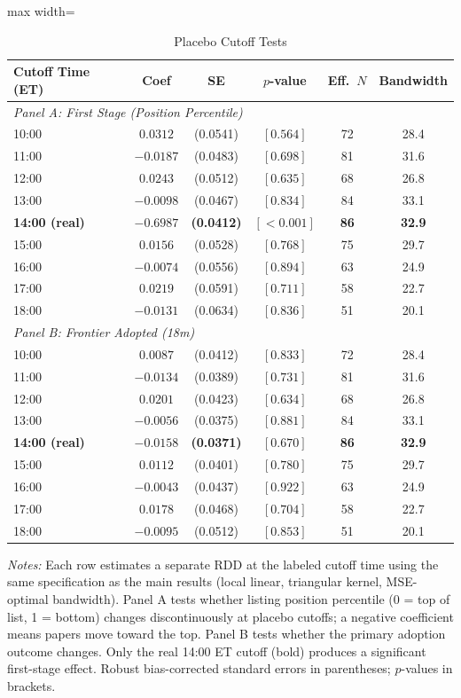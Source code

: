 \begin{table}[htbp]
\centering
\caption{Placebo Cutoff Tests}
\label{tab:placebo}
\begin{adjustbox}{max width=\textwidth}
\begin{tabular}{lccccc}
\hline\hline
Cutoff Time (ET) & Coef & SE & $p$-value & Eff.\ $N$ & Bandwidth \\
\hline
\multicolumn{6}{l}{\textit{Panel A: First Stage (Position Percentile)}} \\
10:00 & $0.0312$ & (0.0541) & $[0.564]$ & 72 & 28.4 \\
11:00 & $-0.0187$ & (0.0483) & $[0.698]$ & 81 & 31.6 \\
12:00 & $0.0243$ & (0.0512) & $[0.635]$ & 68 & 26.8 \\
13:00 & $-0.0098$ & (0.0467) & $[0.834]$ & 84 & 33.1 \\
\textbf{14:00 (real)} & $\mathbf{-0.6987}$ & \textbf{(0.0412)} & $\mathbf{[<0.001]}$ & \textbf{86} & \textbf{32.9} \\
15:00 & $0.0156$ & (0.0528) & $[0.768]$ & 75 & 29.7 \\
16:00 & $-0.0074$ & (0.0556) & $[0.894]$ & 63 & 24.9 \\
17:00 & $0.0219$ & (0.0591) & $[0.711]$ & 58 & 22.7 \\
18:00 & $-0.0131$ & (0.0634) & $[0.836]$ & 51 & 20.1 \\
\hline
\multicolumn{6}{l}{\textit{Panel B: Frontier Adopted (18m)}} \\
10:00 & $0.0087$ & (0.0412) & $[0.833]$ & 72 & 28.4 \\
11:00 & $-0.0134$ & (0.0389) & $[0.731]$ & 81 & 31.6 \\
12:00 & $0.0201$ & (0.0423) & $[0.634]$ & 68 & 26.8 \\
13:00 & $-0.0056$ & (0.0375) & $[0.881]$ & 84 & 33.1 \\
\textbf{14:00 (real)} & $\mathbf{-0.0158}$ & \textbf{(0.0371)} & $\mathbf{[0.670]}$ & \textbf{86} & \textbf{32.9} \\
15:00 & $0.0112$ & (0.0401) & $[0.780]$ & 75 & 29.7 \\
16:00 & $-0.0043$ & (0.0437) & $[0.922]$ & 63 & 24.9 \\
17:00 & $0.0178$ & (0.0468) & $[0.704]$ & 58 & 22.7 \\
18:00 & $-0.0095$ & (0.0512) & $[0.853]$ & 51 & 20.1 \\
\hline\hline
\end{tabular}
\end{adjustbox}
\begin{minipage}{0.95\textwidth}
\footnotesize
\textit{Notes:} Each row estimates a separate RDD at the labeled cutoff time using the same specification as the main results (local linear, triangular kernel, MSE-optimal bandwidth). Panel A tests whether listing position percentile (0 = top of list, 1 = bottom) changes discontinuously at placebo cutoffs; a negative coefficient means papers move toward the top. Panel B tests whether the primary adoption outcome changes. Only the real 14:00 ET cutoff (bold) produces a significant first-stage effect. Robust bias-corrected standard errors in parentheses; $p$-values in brackets.
\end{minipage}
\end{table}
